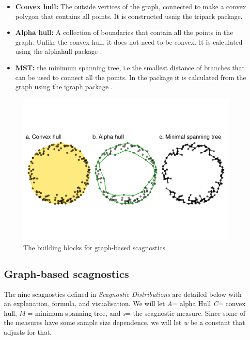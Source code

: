 \begin{itemize}
\item
  \textbf{Convex hull:} The outside vertices of the graph, connected to
  make a convex polygon that contains all points. It is constructed
  usnig the tripack package.
\item
  \textbf{Alpha hull:} A collection of boundaries that contain all the
  points in the graph. Unlike the convex hull, it does not need to be
  convex. It is calculated using the alphahull package
  \citep{alphahull}.
\item
  \textbf{MST:} the minimum spanning tree, i.e the smallest distance of
  branches that can be used to connect all the points. In the package it
  is calculated from the graph using the igraph package \citep{igraph}.
\end{itemize}

\begin{Schunk}
\begin{figure}
\includegraphics[width=1\linewidth]{mason-lee-laa-cook_files/figure-latex/building-blocks2-1} \caption[The building blocks for graph-based scagnostics]{The building blocks for graph-based scagnostics}\label{fig:building-blocks2}
\end{figure}
\end{Schunk}

\hypertarget{graph-based-scagnostics}{%
\subsection{Graph-based scagnostics}\label{graph-based-scagnostics}}

The nine scagnostics defined in \emph{Scagnostic Distributions} are
detailed below with an explanation, formula, and visualisation. We will
let \emph{A}= alpha Hull \emph{C}= convex hull, \emph{M} = minimum
spanning tree, and \emph{s}= the scagnostic measure. Since some of the
measures have some sample size dependence, we will let \emph{w} be a
constant that adjusts for that.

